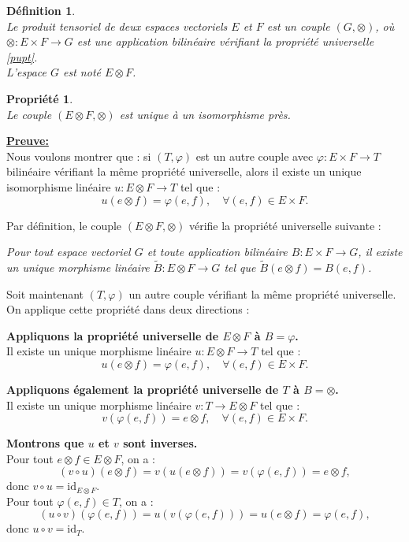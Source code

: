 \documentclass[a4paper, 14pt]{report}
\newtheorem{definition}{Définition}[section]
\newtheorem{propriety}{Propriété}[section]
\begin{document}
\begin{onehalfspace}
{\begin{definition} \cite{greub2012linear}\\
	Le produit tensoriel de deux espaces vectoriels $E$ et $F$ est un couple $(G, \otimes)$, où $\otimes : E \times F \to G$ est une application bilinéaire vérifiant la propriété universelle \ref{pupt}.\\
	L'espace $G$ est noté $E \otimes F$.
\end{definition}

\begin{propriety} \cite{greub2012linear}\\
Le couple \( (E \otimes F, \otimes) \) est unique à un isomorphisme près.
\end{propriety}

\textbf{\underline{Preuve:}}  \\
Nous voulons montrer que : si \( (T, \varphi) \) est un autre couple avec \( \varphi : E \times F \to T \) bilinéaire vérifiant la même propriété universelle, alors il existe un unique isomorphisme linéaire \( u : E \otimes F \to T \) tel que :
\[
u(e \otimes f) = \varphi(e, f), \quad \forall (e, f) \in E \times F.
\]

	Par définition, le couple \( (E \otimes F, \otimes) \) vérifie la propriété universelle suivante :

\emph{Pour tout espace vectoriel \( G \) et toute application bilinéaire \( B : E \times F \to G \), il existe un unique morphisme linéaire \( \tilde{B} : E \otimes F \to G \) tel que \( \tilde{B}(e \otimes f) = B(e, f) \).}

Soit maintenant \( (T, \varphi) \) un autre couple vérifiant la même propriété universelle.  
On applique cette propriété dans deux directions :

\textbf{Appliquons la propriété universelle de \( E \otimes F \) à \( B = \varphi \).}\\
Il existe un unique morphisme linéaire \( u : E \otimes F \to T \) tel que :
\[
u(e \otimes f) = \varphi(e, f), \quad \forall (e,f) \in E \times F.
\]

\textbf{Appliquons également la propriété universelle de \( T \) à \( B = \otimes \).}\\
Il existe un unique morphisme linéaire \( v : T \to E \otimes F \) tel que :
\[
v(\varphi(e, f)) = e \otimes f, \quad \forall (e,f) \in E \times F.
\]

\textbf{Montrons que \( u \) et \( v \) sont inverses.}\\
Pour tout \( e \otimes f \in E \otimes F \), on a :
\[
(v \circ u)(e \otimes f) = v(u(e \otimes f)) = v(\varphi(e, f)) = e \otimes f,
\]
donc \( v \circ u = \mathrm{id}_{E \otimes F} \).\\
Pour tout \( \varphi(e, f) \in T \), on a :
\[
(u \circ v)(\varphi(e, f)) = u(v(\varphi(e, f))) = u(e \otimes f) = \varphi(e, f),
\]
donc \( u \circ v = \mathrm{id}_T \).

}
\end{onehalfspace}
\end{document}
